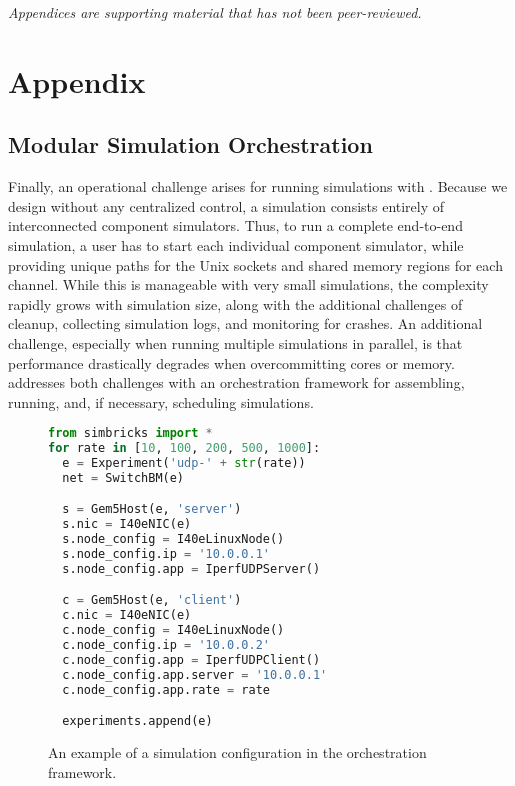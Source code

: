 \noindent
\emph{Appendices are supporting material that has not been
peer-reviewed.}

\section{Appendix}

\subsection{Modular Simulation Orchestration}
\label{ssec:appendix:orchestration}
Finally, an operational challenge arises for running simulations with \sysname.
Because we design \sysname without any centralized control, a simulation
consists entirely of interconnected component simulators.
Thus, to run a complete end-to-end simulation, a user has to start each
individual component simulator, while providing unique paths for the Unix
sockets and shared memory regions for each channel.
While this is manageable with very small simulations, the complexity rapidly
grows with simulation size, along with the additional challenges of cleanup,
collecting simulation logs, and monitoring for crashes.
An additional challenge, especially when running multiple simulations in
parallel, is that performance drastically degrades when overcommitting cores or
memory.
\sysname addresses both challenges with an orchestration framework for
assembling, running, and, if necessary, scheduling simulations.

\begin{figure}[h]%
\begin{lstlisting}[language=Python]
from simbricks import *
for rate in [10, 100, 200, 500, 1000]:
  e = Experiment('udp-' + str(rate))
  net = SwitchBM(e)

  s = Gem5Host(e, 'server')
  s.nic = I40eNIC(e)
  s.node_config = I40eLinuxNode()
  s.node_config.ip = '10.0.0.1'
  s.node_config.app = IperfUDPServer()

  c = Gem5Host(e, 'client')
  c.nic = I40eNIC(e)
  c.node_config = I40eLinuxNode()
  c.node_config.ip = '10.0.0.2'
  c.node_config.app = IperfUDPClient()
  c.node_config.app.server = '10.0.0.1'
  c.node_config.app.rate = rate

  experiments.append(e)
\end{lstlisting}\vspace{0.5em}%
\caption{An example of a simulation configuration in the \sysname
  orchestration framework.}%
\label{fig:orchestration}%
%
\end{figure}

